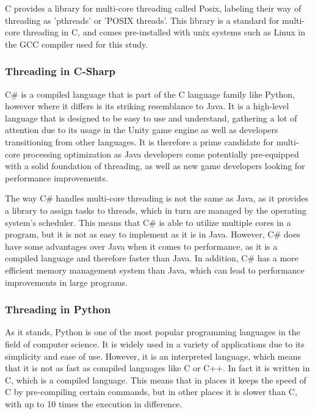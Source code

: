 \documentclass[12pt,a4paper]{article}
\begin{document}
C provides a library for multi-core threading called Posix, labeling their way of threading as 'pthreads' or 'POSIX threads'. This library is a standard for multi-core threading in C, and comes pre-installed with unix systems such as Linux in the GCC compiler used for this study.

\subsubsection{Threading in C-Sharp}

C\# is a compiled language that is part of the C language family like Python, however where it differs is its striking resemblance to Java. It is a high-level language that is designed to be easy to use and understand, gathering a lot of attention due to its usage in the Unity game engine as well as developers transitioning from other languages. It is therefore a prime candidate for multi-core processing optimization as Java developers come potentially pre-equipped with a solid foundation of threading, as well as new game developers looking for performance improvements.

The way C\# handles multi-core threading is not the same as Java, as it provides a library to assign tasks to threads, which in turn are managed by the operating system's scheduler. This means that C\# is able to utilize multiple cores in a program, but it is not as easy to implement as it is in Java. However, C\# does have some advantages over Java when it comes to performance, as it is a compiled language and therefore faster than Java. In addition, C\# has a more efficient memory management system than Java, which can lead to performance improvements in large programs.

\subsubsection{Threading in Python}

As it stands, Python is one of the most popular programming languages in the field of computer science. It is widely used in a variety of applications due to its simplicity and ease of use. However, it is an interpreted language, which means that it is not as fast as compiled languages like C or C++. In fact it is written in C, which is a compiled language. This means that in places it keeps the speed of C by pre-compiling certain commands, but in other places it is slower than C, with up to 10 times the execution in difference.
\end{document}
